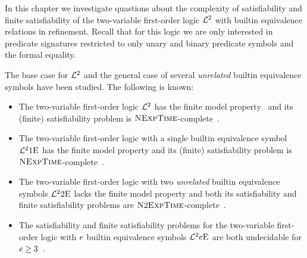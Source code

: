 In this chapter we investigate quastions about the complexity of satisfiability
and finite satisfiability of the two-variable first-order logic $\mathcal{L}^{2}$ with
builtin equivalence relations in refinement. Recall that for this logic we are
only interested in predicate signatures restricted to only unary and binary
predicate symbols and the formal equality.

The base case for $\mathcal{L}^{2}$ and the general case of several \emph{unrelated}
builtin equivalence symbols have been studied. The following is known:
\begin{itemize}
  \item The two-variable first-order logic $\mathcal{L}^{2}$ has the finite model
  property~\cite{MALQ:MALQ19750210118} and its (finite) satisfiability problem
  is $\text{\normalfont{\scshape NExpTime}}$-complete~\cite{gradel1997decision}.
  \item The two-variable first-order logic with a single builtin equivalence
  symbol $\mathcal{L}^{2}{1}\mathrm{E}_{{}}$ has the finite model property and its (finite)
  satisfiability problem is $\text{\normalfont{\scshape NExpTime}}$-complete~\cite{kieronski2005results}.
  \item The two-variable first-order logic with two \emph{unrelated} builtin
  equivalence symbols $\mathcal{L}^{2}{2}\mathrm{E}_{{}}$ lacks the finite model property and both
  its satisfiability and finite satisfiability problems are
  $\text{\normalfont{\scshape N}}2\text{\normalfont{\scshape ExpTime}}$-complete~\cite{doi:10.1137/120900095}.
  \item The satisfiability and finite satisfiability problems for
  the two-variable first-order logic with $e$ builtin equivalence symbols
  $\mathcal{L}^{2}{e}\mathrm{E}_{{}}$ are both undecidable for $e \geq
  3$~\cite{kieronski2005small}.
\end{itemize}
